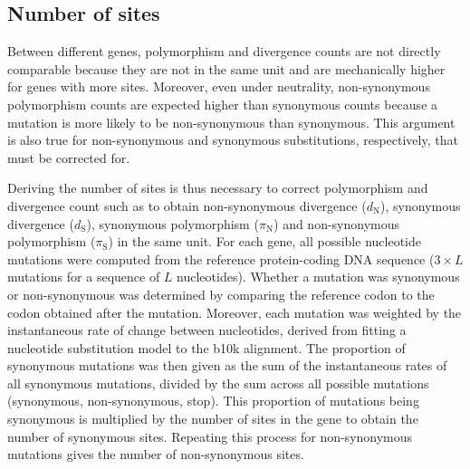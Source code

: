 \documentclass[10pt]{article}
\newcommand{\dn}{d_{\text{N}}}
\newcommand{\ds}{d_{\text{S}}}
\newcommand{\pin}{\pi_{\text{N}}}
\newcommand{\pis}{\pi_{\text{S}}}
\begin{document}
    \subsection{Number of sites}\label{subsec:nunber-of-sites}
    Between different genes, polymorphism and divergence counts are not directly comparable because they are not in the same unit and are mechanically higher for genes with more sites.
    Moreover, even under neutrality, non-synonymous polymorphism counts are expected higher than synonymous counts because a mutation is more likely to be non-synonymous than synonymous.
    This argument is also true for non-synonymous and synonymous substitutions, respectively, that must be corrected for.

    Deriving the number of sites is thus necessary to correct polymorphism and divergence count such as to obtain non-synonymous divergence ($\dn$), synonymous divergence ($\ds$), synonymous polymorphism ($\pin$) and non-synonymous polymorphism ($\pis$) in the same unit.
    For each gene, all possible nucleotide mutations were computed from the reference protein-coding DNA sequence ($3 \times L$ mutations for a sequence of $L$ nucleotides).
    Whether a mutation was synonymous or non-synonymous was determined by comparing the reference codon to the codon obtained after the mutation.
    Moreover, each mutation was weighted by the instantaneous rate of change between nucleotides, derived from fitting a nucleotide substitution model to the b10k alignment.
    The proportion of synonymous mutations was then given as the sum of the instantaneous rates of all synonymous mutations, divided by the sum across all possible mutations (synonymous, non-synonymous, stop).
    This proportion of mutations being synonymous is multiplied by the number of sites in the gene to obtain the number of synonymous sites.
    Repeating this process for non-synonymous mutations gives the number of non-synonymous sites.
\end{document}
